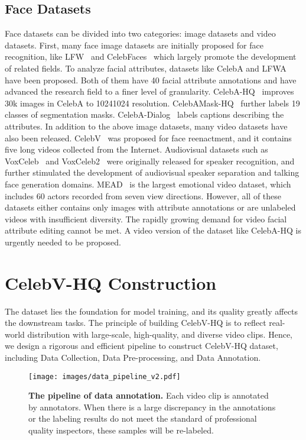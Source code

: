 \documentclass[runningheads]{llncs}
\begin{document}
\subsection{Face Datasets} 
Face datasets can be divided into two categories: image datasets and video datasets. 
First, many face image datasets are initially proposed for face recognition, like LFW~\cite{LFW} and CelebFaces~\cite{celebfaces} which largely promote the development of related fields.
To analyze facial attributes, datasets like CelebA and LFWA \cite{celeba15} have been proposed. Both of them have 40 facial attribute annotations and have advanced the research field to a finer level of granularity. CelebA-HQ~\cite{celebahq} improves 30k images in CelebA to 10241024 resolution. CelebAMask-HQ~\cite{celebahq_mask} further labels 19 classes of segmentation masks. CelebA-Dialog~\cite{celeba_dialog} labels captions describing the attributes.  
In addition to the above image datasets, many video datasets have also been released. CelebV~\cite{wayne2018reenactgan} was proposed for face reenactment, and it contains five long videos collected from the Internet. 
Audiovisual datasets such as VoxCeleb~\cite{vox17} and VoxCeleb2~\cite{vox2} were originally released for speaker recognition, and further stimulated the development of audiovisual speaker separation and talking face generation domains. 
MEAD~\cite{mead} is the largest emotional video dataset, which includes 60 actors recorded from seven view directions.
However, all of these datasets either contains only images with attribute annotations or are unlabeled videos with insufficient diversity. The rapidly growing demand for video facial attribute editing cannot be met. A video version of the dataset like CelebA-HQ \cite{celebahq} is urgently needed to be proposed. 




\section{CelebV-HQ Construction}
The dataset lies the foundation for model training, and its quality greatly affects the downstream tasks. The principle of building CelebV-HQ is to reflect real-world distribution with large-scale, high-quality, and diverse video clips. Hence, we design a rigorous and efficient pipeline to construct CelebV-HQ dataset, including Data Collection, Data Pre-processing, and Data Annotation.


\begin{figure*}[t]
\centering
\texttt{[image: images/data\_pipeline\_v2.pdf]}\caption{\textbf{The pipeline of data annotation.} Each video clip is annotated by  annotators. When there is a large discrepancy in the annotations or the labeling results do not meet the standard of professional quality inspectors, these samples will be re-labeled.}
\label{fig:data_pipeline}
\vspace{-2mm}
\end{figure*}
\end{document}
